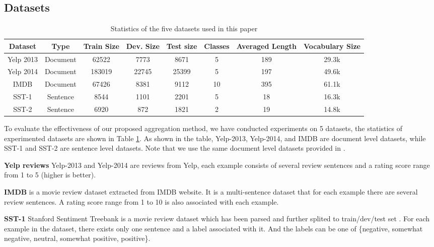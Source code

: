 \documentclass[11pt]{article}
\begin{document}
\subsection{Datasets}
\begin{table}[t!] \setlength{\tabcolsep}{3pt}
  \centering \begin{tabular}{cccccccc}
    \toprule
\textbf{Dataset} &\textbf{Type} &\textbf{Train Size} & \textbf{Dev. Size} &\textbf{Test size} & \textbf{Classes}  &\textbf{Averaged Length}   &\textbf{Vocabulary Size}\\
    \midrule Yelp 2013         &Document      &62522       &7773    &8671     &5    &189 	&29.3k\\
Yelp 2014         &Document      &183019      &22745   &25399 	 &5    &197     &49.6k\\
IMDB          	  &Document      &67426      &8381   &9112 	     &10    &395    &61.1k\\
SST-1         	  &Sentence      &8544      &1101   &2201	     &5    &18      &16.3k\\
SST-2         	  &Sentence      &6920      &872   &1821	     &2    &19      &14.8k\\
    \bottomrule
  \end{tabular}
  \caption{Statistics of the five datasets used in this paper}
  \label{tab:dataset}
\end{table}




  To evaluate the effectiveness of our proposed aggregation method, we have conducted experiments on 5 datasets, the statistics of experimented datasets are shown in Table \ref{tab:dataset}. As shown in the table, Yelp-2013, Yelp-2014, and IMDB are document level datasets, while SST-1 and SST-2 are sentence level datasets. Note that we use the same document level datasets provided in \cite{tang2015learning}.




\textbf{Yelp reviews} Yelp-2013 and Yelp-2014 are reviews from Yelp, each example consists of several review sentences and a rating score range from 1 to 5 (higher is better).

\textbf{IMDB} is a movie review dataset extracted from IMDB website. It is a multi-sentence dataset that for each example there are several review sentences. A rating score range from 1 to 10 is also associated with each example.


\textbf{SST-1} Stanford Sentiment Treebank is a movie review dataset which has been parsed and further splited to train/dev/test set \cite{socher2013recursive}. For each example in the dataset, there exists only one sentence and a label associated with it. And the labels can be one of \{negative, somewhat negative, neutral, somewhat positive, positive\}.
\end{document}
